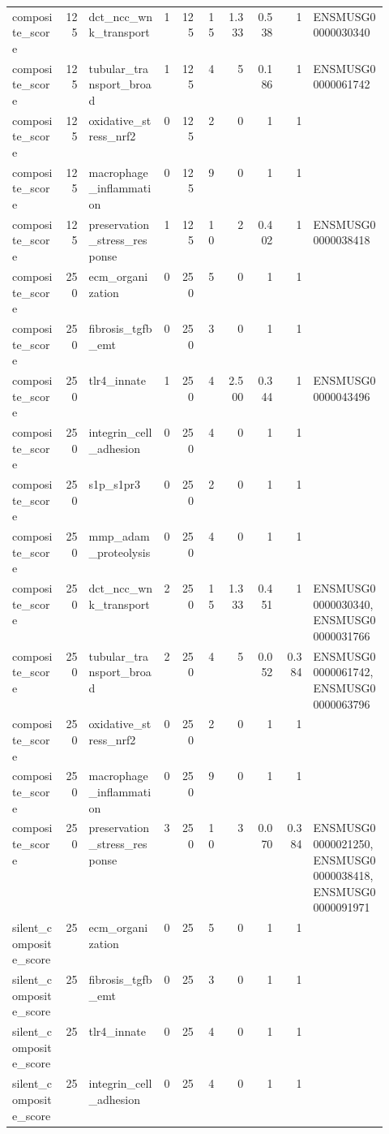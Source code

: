 \documentclass[11pt]{article}
\begin{document}
\begin{landscape}
\begin{longtable}{p{0.14\linewidth}rp{0.20\linewidth}rrrrrrp{0.20\linewidth}}
composite\_score & 125 & dct\_ncc\_wnk\_transport & 1 & 125 & 15 & 1.333 & 0.538 & 1 & ENSMUSG00000030340 \\
composite\_score & 125 & tubular\_transport\_broad & 1 & 125 & 4 & 5 & 0.186 & 1 & ENSMUSG00000061742 \\
composite\_score & 125 & oxidative\_stress\_nrf2 & 0 & 125 & 2 & 0 & 1 & 1 &  \\
composite\_score & 125 & macrophage\_inflammation & 0 & 125 & 9 & 0 & 1 & 1 &  \\
composite\_score & 125 & preservation\_stress\_response & 1 & 125 & 10 & 2 & 0.402 & 1 & ENSMUSG00000038418 \\
composite\_score & 250 & ecm\_organization & 0 & 250 & 5 & 0 & 1 & 1 &  \\
composite\_score & 250 & fibrosis\_tgfb\_emt & 0 & 250 & 3 & 0 & 1 & 1 &  \\
composite\_score & 250 & tlr4\_innate & 1 & 250 & 4 & 2.500 & 0.344 & 1 & ENSMUSG00000043496 \\
composite\_score & 250 & integrin\_cell\_adhesion & 0 & 250 & 4 & 0 & 1 & 1 &  \\
composite\_score & 250 & s1p\_s1pr3 & 0 & 250 & 2 & 0 & 1 & 1 &  \\
composite\_score & 250 & mmp\_adam\_proteolysis & 0 & 250 & 4 & 0 & 1 & 1 &  \\
composite\_score & 250 & dct\_ncc\_wnk\_transport & 2 & 250 & 15 & 1.333 & 0.451 & 1 & ENSMUSG00000030340,ENSMUSG00000031766 \\
composite\_score & 250 & tubular\_transport\_broad & 2 & 250 & 4 & 5 & 0.052 & 0.384 & ENSMUSG00000061742,ENSMUSG00000063796 \\
composite\_score & 250 & oxidative\_stress\_nrf2 & 0 & 250 & 2 & 0 & 1 & 1 &  \\
composite\_score & 250 & macrophage\_inflammation & 0 & 250 & 9 & 0 & 1 & 1 &  \\
composite\_score & 250 & preservation\_stress\_response & 3 & 250 & 10 & 3 & 0.070 & 0.384 & ENSMUSG00000021250,ENSMUSG00000038418,ENSMUSG00000091971 \\
silent\_composite\_score & 25 & ecm\_organization & 0 & 25 & 5 & 0 & 1 & 1 &  \\
silent\_composite\_score & 25 & fibrosis\_tgfb\_emt & 0 & 25 & 3 & 0 & 1 & 1 &  \\
silent\_composite\_score & 25 & tlr4\_innate & 0 & 25 & 4 & 0 & 1 & 1 &  \\
silent\_composite\_score & 25 & integrin\_cell\_adhesion & 0 & 25 & 4 & 0 & 1 & 1 &  \\

\end{longtable}
\end{landscape}
\end{document}
